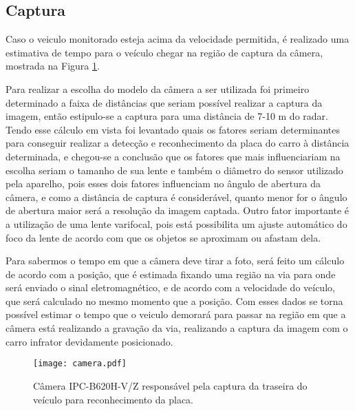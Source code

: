     \subsection{Captura}
    Caso o veiculo monitorado esteja acima da velocidade permitida, é realizado uma estimativa de tempo para o veículo chegar na região de captura da câmera, mostrada na Figura \ref{camera}.
    
    Para realizar a escolha do modelo da câmera a ser utilizada foi primeiro determinado a faixa de distâncias que seriam possível realizar a captura da imagem, então estipulo-se a captura para uma distância de 7-10 m do radar. Tendo esse cálculo em vista foi levantado quais os fatores seriam determinantes para conseguir realizar a detecção e reconhecimento da placa do carro à distância determinada, e chegou-se a conclusão que os fatores que mais influenciariam na escolha seriam o tamanho de sua lente e também o diâmetro do sensor utilizado pela aparelho, pois esses dois fatores influenciam no ângulo de abertura da câmera, e como a distância de captura é considerável, quanto menor for o ângulo de abertura maior será a resolução da imagem captada. Outro fator importante é a utilização de uma lente varifocal, pois está possibilita um ajuste automático do foco da lente de acordo com que os objetos se aproximam ou afastam dela. 
    
    
    Para sabermos o tempo em que a câmera deve tirar a foto, será feito um cálculo de acordo com a posição, que é estimada fixando uma região na via para onde será enviado o sinal eletromagnético, e de acordo com a velocidade do veículo, que  será calculado no mesmo momento que a posição. Com esses dados se torna possível estimar o tempo que o veiculo demorará para passar na região em que a câmera está realizando a gravação da via, realizando a captura da imagem com o carro infrator devidamente posicionado.
    \begin{figure}[H]
    \centering
    \texttt{[image: camera.pdf]}
    \caption{Câmera IPC-B620H-V/Z responsável pela captura da traseira do veículo para reconhecimento da placa.}
    \label{camera}
\end{figure}

